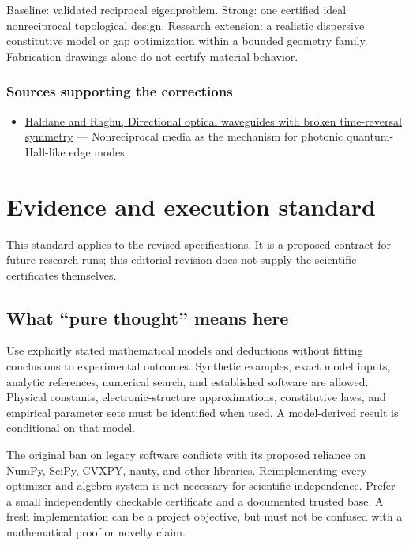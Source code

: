\documentclass[
  11pt,
]{article}
\providecommand{\tightlist}{%
  \setlength{\itemsep}{0pt}\setlength{\parskip}{0pt}}
\begin{document}
Baseline: validated reciprocal eigenproblem. Strong: one certified ideal
nonreciprocal topological design. Research extension: a realistic
dispersive constitutive model or gap optimization within a bounded
geometry family. Fabrication drawings alone do not certify material
behavior.

\subsubsection{Sources supporting the corrections}

\begin{itemize}
\tightlist
\item
  \href{https://journals.aps.org/prl/abstract/10.1103/PhysRevLett.100.013904}{Haldane
  and Raghu, Directional optical waveguides with broken time-reversal
  symmetry} --- Nonreciprocal media as the mechanism for photonic
  quantum-Hall-like edge modes.
\end{itemize}

\section{Evidence and execution standard}

This standard applies to the revised specifications. It is a proposed
contract for future research runs; this editorial revision does not
supply the scientific certificates themselves.

\subsection{What ``pure thought'' means here}

Use explicitly stated mathematical models and deductions without fitting
conclusions to experimental outcomes. Synthetic examples, exact model
inputs, analytic references, numerical search, and established software
are allowed. Physical constants, electronic-structure approximations,
constitutive laws, and empirical parameter sets must be identified when
used. A model-derived result is conditional on that model.

The original ban on legacy software conflicts with its proposed reliance
on NumPy, SciPy, CVXPY, nauty, and other libraries. Reimplementing every
optimizer and algebra system is not necessary for scientific
independence. Prefer a small independently checkable certificate and a
documented trusted base. A fresh implementation can be a project
objective, but must not be confused with a mathematical proof or novelty
claim.
\end{document}
